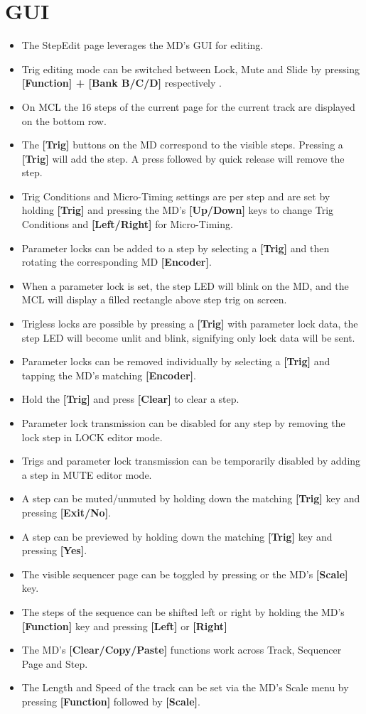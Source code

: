 \section{GUI}
\begin{itemize}
\item The StepEdit page leverages the MD's GUI for editing.
\item Trig editing mode can be switched between Lock, Mute and Slide by pressing \textbf{[Function] + [Bank B/C/D] }respectively .
\item On MCL the 16 steps of the current page for the current track are displayed on the bottom row.
\item The \textbf{[Trig]} buttons on the MD correspond to the visible steps. Pressing a \textbf{[Trig]} will add the step. A press followed by quick release will remove the step. 
\item Trig Conditions and Micro-Timing settings are per step and are set by holding \textbf{[Trig]} and pressing the MD's \textbf{[Up/Down]} keys to change Trig Conditions and \textbf{[Left/Right]} for Micro-Timing.
\item Parameter locks can be added to a step by selecting a \textbf{[Trig]} and then rotating the corresponding MD \textbf{[Encoder]}.
\item When a parameter lock is set, the step LED will blink on the MD, and the MCL will display a filled rectangle above step trig on screen.
\item Trigless locks are possible by pressing a \textbf{[Trig]} with parameter lock data, the step LED will become unlit and blink, signifying only lock data will be sent.
\item Parameter locks can be removed individually by selecting a \textbf{[Trig]} and tapping the MD's matching \textbf{[Encoder]}. 
\item Hold the \textbf{[Trig]} and press \textbf{[Clear]} to clear a step.
\item Parameter lock transmission can be disabled for any step by removing the lock step in LOCK editor mode.
\item Trigs and parameter lock transmission can be temporarily disabled by adding a step in MUTE editor mode.
\item A step can be muted/unmuted by holding down the matching \textbf{[Trig]} key and pressing \textbf{[Exit/No]}.
\item A step can be previewed by holding down the matching \textbf{[Trig]} key and pressing \textbf{[Yes]}.
\item The visible sequencer page can be toggled by pressing or the MD's \textbf{[Scale]} key.
\item The steps of the sequence can be shifted left or right by holding the MD's \textbf{[Function]} key and pressing \textbf{[Left]} or \textbf{[Right]}
\item The MD's \textbf{[Clear/Copy/Paste]} functions work across Track, Sequencer Page and Step.
\item The Length and Speed of the track can be set via the MD's Scale menu by pressing \textbf{[Function]} followed by \textbf{[Scale]}.

\end{itemize}
\newpage
